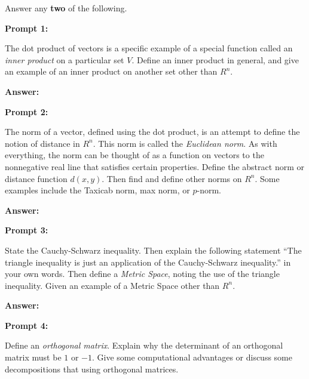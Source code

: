 \documentclass[10pt,letterpaper,final]{report}
\begin{document}
\begin{center}
  \vline
\end{center}

\noindent Answer any \textbf{two} of the following.

\medskip
\noindent\textbf{Prompt 1:}
\medskip

The dot product of vectors is a specific example of a special function called an \emph{inner product} on a particular set $V$. Define an inner product in general, and give an example of an inner product on another set other than $R^n$.

\medskip
\noindent\textbf{Answer:}
\medskip

\pagebreak
\noindent\textbf{Prompt 2:}
\medskip

The norm of a vector, defined using the dot product, is an attempt to define the notion of distance in $R^n$. This norm is called the \emph{Euclidean norm}.  As with everything, the norm can be thought of as a function on vectors to the nonnegative real line that satisfies certain properties. Define the abstract norm or distance function $d(x,y)$.  Then find and define other norms on $R^n$. Some examples include the Taxicab norm, max norm, or $p$-norm.

\medskip
\noindent\textbf{Answer:}
\medskip

\pagebreak
\noindent\textbf{Prompt 3:}
\medskip

State the Cauchy-Schwarz inequality.  Then explain the following statement ``The triangle inequality is just an application of the Cauchy-Schwarz inequality.'' in your own words. Then define a \emph{Metric Space}, noting the use of the triangle inequality. Given an example of a Metric Space other than $R^n$.

\medskip
\noindent\textbf{Answer:}
\medskip

\pagebreak
\noindent\textbf{Prompt 4:}
\medskip

Define an \emph{orthogonal matrix}. Explain why the determinant of an orthogonal matrix must be $1$ or $-1$. Give some computational advantages or discuss some decompositions that using orthogonal matrices.
\end{document}
